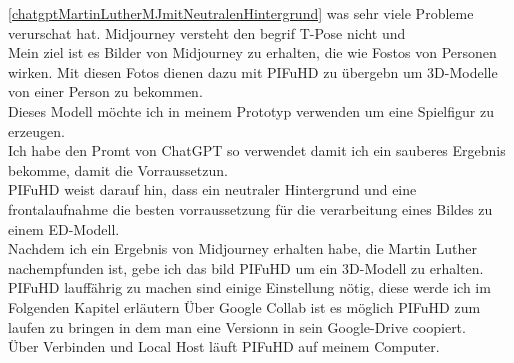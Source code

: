 \documentclass[10pt,a4paper,bibliography=totocnumbered,listof=totocnumbered]{scrartcl}
\begin{document}
 \ref{chatgptMartinLutherMJmitNeutralenHintergrund} was sehr viele Probleme verurschat hat. Midjourney versteht den begrif T-Pose nicht und 
\\
Mein ziel ist es Bilder von Midjourney zu erhalten, die wie Fostos von Personen wirken. Mit diesen Fotos dienen dazu mit PIFuHD zu übergebn um 3D-Modelle von einer Person zu bekommen.
\\
Dieses Modell möchte ich in meinem Prototyp verwenden um eine Spielfigur zu erzeugen.
\\
Ich habe den Promt von ChatGPT so verwendet damit ich ein sauberes Ergebnis bekomme, damit die Vorraussetzun.
\\
PIFuHD weist darauf hin, dass ein neutraler Hintergrund und eine frontalaufnahme die besten vorraussetzung für die verarbeitung eines Bildes zu einem ED-Modell.
\\
Nachdem ich ein Ergebnis von Midjourney erhalten habe, die Martin Luther nachempfunden ist, gebe ich das bild PIFuHD um ein 3D-Modell zu erhalten.
\\
PIFuHD lauffährig zu machen sind einige Einstellung nötig, diese werde ich im Folgenden Kapitel erläutern
Über Google Collab ist es möglich PIFuHD zum laufen zu bringen in dem man eine Versionn in sein Google-Drive coopiert.
\\
Über Verbinden und Local Host läuft PIFuHD auf meinem Computer.
\\
\end{document}
